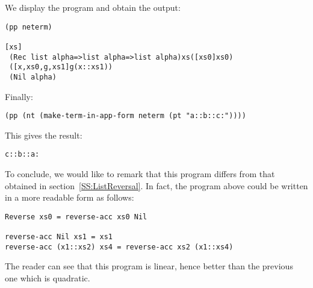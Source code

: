\documentclass[12pt]{amsart}
\begin{document}



We display the program and obtain the output:
\begin{verbatim}
(pp neterm)

[xs]
 (Rec list alpha=>list alpha=>list alpha)xs([xs0]xs0)
 ([x,xs0,g,xs1]g(x::xs1))
 (Nil alpha)
\end{verbatim}

Finally:
\begin{verbatim}
(pp (nt (make-term-in-app-form neterm (pt "a::b::c:"))))
\end{verbatim}
This gives the result:
\begin{verbatim}
c::b::a:
\end{verbatim}

To conclude, we would like to remark that this program differs from
that obtained in section~\ref{SS:ListReversal}.  In fact, the program
above could be written in a more readable form as follows:
\begin{verbatim}
Reverse xs0 = reverse-acc xs0 Nil

reverse-acc Nil xs1 = xs1
reverse-acc (x1::xs2) xs4 = reverse-acc xs2 (x1::xs4)
\end{verbatim}
The reader can see that this program is linear, hence better than the
previous one which is quadratic.
\end{document}
